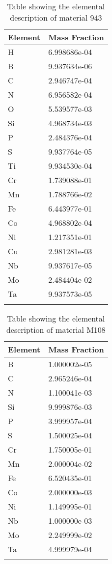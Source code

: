 \begin{centering}
\begin{longtable}[ht!]
{ p{} | p{} }
\hline
Element & Mass Fraction\\
\hline
H &  6.998686e-04\\
B &  9.937634e-06\\
C &  2.946747e-04\\
N &  6.956582e-04\\
O &  5.539577e-03\\
Si &  4.968734e-03\\
P &  2.484376e-04\\
S &  9.937764e-05\\
Ti &  9.934530e-04\\
Cr &  1.739088e-01\\
Mn &  1.788766e-02\\
Fe &  6.443977e-01\\
Co &  4.968802e-04\\
Ni &  1.217351e-01\\
Cu &  2.981281e-03\\
Nb &  9.937617e-05\\
Mo &  2.484404e-02\\
Ta &  9.937573e-05\\

\caption{Table showing the elemental description of material 943}
\label{table:material_EPPBDY}
\end{longtable}
\clearpage

\begin{longtable}[ht!]
{ p{} | p{} }
\hline
Element & Mass Fraction\\
\hline
B &  1.000002e-05\\
C &  2.965246e-04\\
N &  1.100041e-03\\
Si &  9.999876e-03\\
P &  3.999957e-04\\
S &  1.500025e-04\\
Cr &  1.750005e-01\\
Mn &  2.000004e-02\\
Fe &  6.520435e-01\\
Co &  2.000000e-03\\
Ni &  1.149995e-01\\
Nb &  1.000000e-03\\
Mo &  2.249999e-02\\
Ta &  4.999979e-04\\

\caption{Table showing the elemental description of material M108}
\label{table:material_M108}
\end{longtable}
\clearpage


\end{centering}
